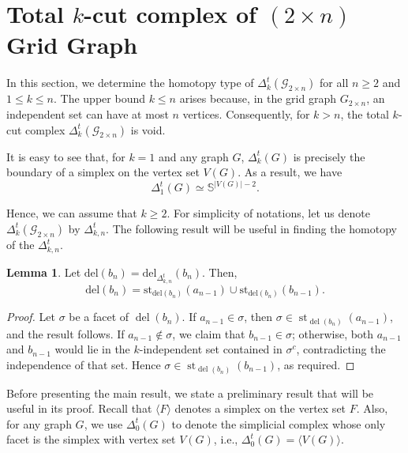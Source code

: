 \documentclass[11pt,reqno,a4paper]{amsart}
\theoremstyle{definition}
\theoremstyle{theorem}
\newtheorem{lemma}[theorem]{Lemma}
\newcommand{\totalkcut}{\Delta_{k}^t}
\newcommand{\twogg}{\mathcal{G}_{2\times n}}
\newcommand{\lno}{\left(}
\newcommand{\rno}{\right)}
\newcommand{\bbS}{\mathbb{S}}
\newcommand{\del}{\mathrm{del}}
\newcommand{\st}{\mathrm{st}}
\theoremstyle{remark}
\begin{document}
\section{Total $k$-cut complex  of $\lno 2\times n\rno$ Grid Graph}\label{section: Total k-cut of 2n gg}
In this section, we determine the homotopy type of $\totalkcut\lno \twogg\rno$ for all $n \ge 2$ and $1 \le k \le n$. 
The upper bound $k \le n$ arises because, in the grid graph $G_{2\times n}$, an independent set can have at most $n$ vertices. 
Consequently, for $k > n$, the total $k$-cut complex $\totalkcut\lno \twogg\rno$ is void.

It is easy to see that, for $k=1$ and any graph $G$, $\Delta_{k}^t (G)$ is precisely the boundary of a simplex on the vertex set $V(G)$. As a result, we have $$\Delta_{1}^t (G) \simeq \bbS^{|V(G)|-2}.$$

Hence, we can assume that $k\geq 2$. For simplicity of notations, let us denote $\totalkcut \lno \twogg \rno$ by $\Delta_{k,n}^t$. The following result will be useful in finding the homotopy of the $\Delta_{k,n}^t$.

\begin{lemma}\label{lemma: del(b_n) = st(a_(n-1)) U  st(b_(n-1))}
    Let $\del\lno b_n \rno = \del_{\Delta_{k,n}^t}\lno b_n\rno$. Then,
    $$\del\lno b_n\rno = \st_{\del\lno b_n \rno}\lno a_{n-1}\rno \cup \st_{\del\lno b_n \rno}\lno b_{n-1}\rno.$$
\end{lemma}
\begin{proof}
Let $\sigma$ be a facet of $\operatorname{del}(b_n)$. 
If $a_{n-1} \in \sigma$, then $\sigma \in \operatorname{st}_{\operatorname{del}(b_n)}(a_{n-1})$, and the result follows. 
If $a_{n-1} \notin \sigma$, we claim that $b_{n-1} \in \sigma$; otherwise, both $a_{n-1}$ and $b_{n-1}$ would lie in the $k$-independent set contained in $\sigma^c$, contradicting the independence of that set. 
Hence $\sigma \in \operatorname{st}_{\operatorname{del}(b_n)}(b_{n-1})$, as required.
\end{proof}

Before presenting the main result, we state a preliminary result that will be useful in its proof. Recall that $\langle F\rangle$ denotes a simplex on the vertex set $F$. Also, for any graph $G$, we use $\Delta_0^t \left( G \right)$ to denote the simplicial complex whose only facet is the simplex with vertex set $V(G)$, i.e., $\Delta_0^t \left( G \right) = \langle V(G) \rangle$.
\end{document}
